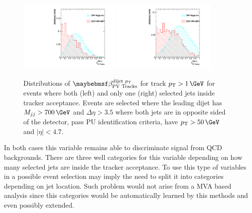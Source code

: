 \begin{figure}[!htb]
\centering
\includegraphics[width=0.45\textwidth]{Chapter06/TrackVariables/Images/BB_Tracks1_TracksERatio.pdf}
\includegraphics[width=0.45\textwidth]{Chapter06/TrackVariables/Images/BE_Tracks1_TracksERatio.pdf}
\caption{Distributions of $\beta_{\text{PV Tracks}}^{\text{dijet }\pt}$ for track $\pt>1\,\GeV$ for events where both (left) and only one (right)  selected jets inside tracker acceptance. Events are selected where the leading dijet has $M_{jj}>700\,\GeV$ and $\Delta\eta>3.5$ where both jets are in opposite sided of the detector, pass \gls{PU} identification criteria, have $\pt>50\,\GeV$ and $|\eta|<4.7$.}
\label{FIGURE:PreparationParkedDataAnalysis_TrackDistributionVariables_Acceptance}
\end{figure}

In both cases this variable remains able to discriminate signal from \gls{QCD} backgrounds. There are three well categories for this variable depending on how many selected jets are inside the tracker acceptance. To use this type of variables in a possible event selection may imply the need to split it into categories depending on jet location. Such problem would not arise from a \gls{MVA} based analysis since this categories would be automatically learned by this methods and even possibly extended.

